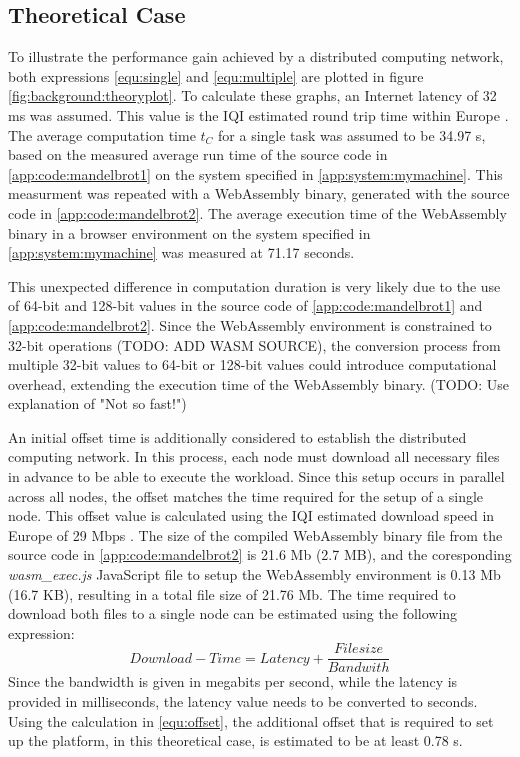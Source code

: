 \subsection{Theoretical Case}
To illustrate the performance gain achieved by a distributed computing network, both expressions \eqref{equ:single} and \eqref{equ:multiple} are plotted in figure \ref{fig:background:theoryplot}. To calculate these graphs, an Internet latency of 32 ms \cite{backend:latency} was assumed. This value is the \ac{IQI} estimated round trip time within Europe \cite{backend:latency}. The average computation time $t_{C}$ for a single task was assumed to be 34.97 s, based on the measured average run time of the source code in \ref{app:code:mandelbrot1} on the system specified in \ref{app:system:mymachine}. This measurment was repeated with a WebAssembly binary, generated with the source code in \ref{app:code:mandelbrot2}. The average execution time of the WebAssembly binary in a browser environment on the system specified in \ref{app:system:mymachine} was measured at 71.17 seconds. 

This unexpected difference in computation duration is very likely due to the use of 64-bit and 128-bit values in the source code of \ref{app:code:mandelbrot1} and \ref{app:code:mandelbrot2}. Since the WebAssembly environment is constrained to 32-bit operations (TODO: ADD WASM SOURCE), the conversion process from multiple 32-bit values to 64-bit or 128-bit values could introduce computational overhead, extending the execution time of the WebAssembly binary. (TODO: Use explanation of "Not so fast!")

An initial offset time is additionally considered to establish the distributed computing network. In this process, each node must download all necessary files in advance to be able to execute the workload. Since this setup occurs in parallel across all nodes, the offset matches the time required for the setup of a single node. This offset value is calculated using the \ac{IQI} estimated download speed in Europe of 29 Mbps \cite{backend:latency}. The size of the compiled WebAssembly binary file from the source code in \ref{app:code:mandelbrot2} is 21.6 Mb (2.7 MB), and the coresponding \emph{wasm\_exec.js} JavaScript file to setup the WebAssembly environment is 0.13 Mb (16.7 KB), resulting in a total file size of 21.76 Mb. The time required to download both files to a single node can be estimated using the following expression:
\begin{equation}
 Download-Time = Latency + \frac{Filesize}{Bandwith} 
 \label{equ:offset}
\end{equation}
Since the bandwidth is given in megabits per second, while the latency is provided in milliseconds, the latency value needs to be converted to seconds. Using the calculation in \ref{equ:offset}, the additional offset that is required to set up the platform, in this theoretical case, is estimated to be at least 0.78 s.

